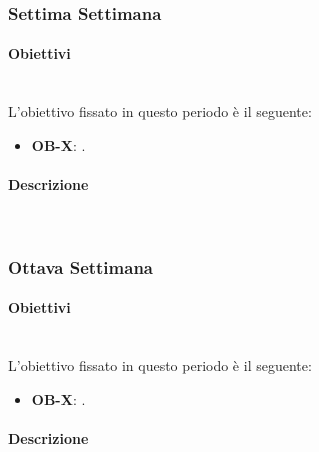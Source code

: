 {    \subsubsection{Settima Settimana}
    	\paragraph{}
    	\paragraph*{Obiettivi} \mbox{}\\ [1mm]
    	L'obiettivo fissato in questo periodo è il seguente:
        \begin{itemize}
            \item \textbf{OB-X}: .
        \end{itemize}
	    \paragraph*{Descrizione} \mbox{}\\ [1mm]
    
    \subsubsection{Ottava Settimana}
    	\paragraph{}
    	\paragraph*{Obiettivi} \mbox{}\\ [1mm]
    	L'obiettivo fissato in questo periodo è il seguente:
    	\begin{itemize}
    		\item \textbf{OB-X}: .
    	\end{itemize}
	    \paragraph*{Descrizione} \mbox{}\\ [1mm]
        
}

\newcommand{\totaleOre}{}

